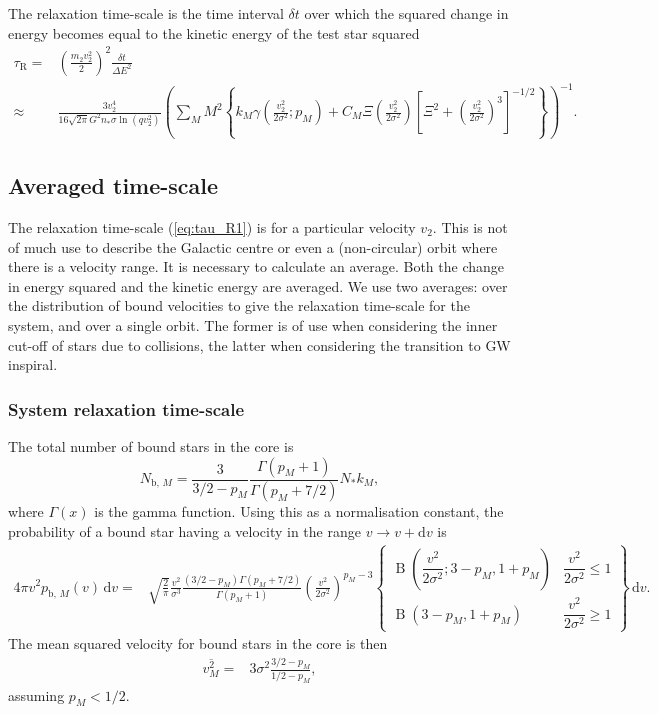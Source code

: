 \documentclass[useAMS,usedcolumn,usegraphicx,usenatbib]{mn2e}
\newcommand{\eqnref}[1]{(\ref{eq:#1})}
\DeclareMathOperator{\Beta}{B}
\newcommand{\sub}[1]{\ensuremath{_\mathrm{#1}}}
\newcommand{\dd}{\ensuremath{\mathrm{d}}}
\begin{document}
\begin{onecolumn}
The relaxation time-scale is the time interval $\delta t$ over which the squared change in energy becomes equal to the kinetic energy of the test star squared \citep{Bar-Or2012}
\begin{align}
\tau\sub{R} = {} & \left(\frac{m_2v_2^2}{2}\right)^2\frac{\delta t}{\Delta E^2} \\
 \approx {} & \frac{3v_2^4}{16\sqrt{2\pi}G^2n_\ast\sigma\ln\left(qv_2^2\right)} \left(\sum_M M^2 \left\{k_M \gamma\left(\frac{v_2^2}{2\sigma^2};p_M\right) + C_M\Xi\left(\frac{v_2^2}{2\sigma^2}\right)\left[\Xi^2 + \left(\frac{v_2^2}{2\sigma^2}\right)^3\right]^{-1/2}\right\}\right)^{-1}.
\label{eq:tau_R1}
\end{align}

\subsection{Averaged time-scale}

The relaxation time-scale \eqnref{tau_R1} is for a particular velocity $v_2$. This is not of much use to describe the Galactic centre or even a (non-circular) orbit where there is a velocity range. It is necessary to calculate an average. Both the change in energy squared and the kinetic energy are averaged. We use two averages: over the distribution of bound velocities to give the relaxation time-scale for the system, and over a single orbit. The former is of use when considering the inner cut-off of stars due to collisions, the latter when considering the transition to GW inspiral.

\subsubsection{System relaxation time-scale}\label{sec:system-ave}

The total number of bound stars in the core is
\begin{equation}
N_{\mathrm{b},\,M} = \frac{3}{3/2 - p_M}\frac{\Gamma(p_M + 1)}{\Gamma(p_M + 7/2)}N_\ast k_M,
\end{equation}
where $\Gamma(x)$ is the gamma function. Using this as a normalisation constant, the probability of a bound star having a velocity in the range $v \rightarrow v + \dd v$ is
\begin{align}
4\pi v^2 p_{\mathrm{b},\,M}(v) \,\dd v = {} & \sqrt{\frac{2}{\pi}} \frac{v^2}{\sigma^3} \frac{\left(3/2 - p_M\right)\Gamma(p_M + 7/2)}{\Gamma(p_M + 1)} \left(\frac{v^2}{2\sigma^2}\right)^{p_M - 3}\left\{\begin{array}{lr}
\Beta\left(\dfrac{v^2}{2\sigma^2}; 3 - p_M, 1 + p_M\right) & \dfrac{v^2}{2\sigma^2} \leq 1 \\
\Beta\left(3 - p_M, 1 + p_M\right) & \dfrac{v^2}{2\sigma^2} \geq 1\end{array}\right\}\,\dd v.
\end{align}
The mean squared velocity for bound stars in the core is then
\begin{align}
\overline{v^2_{M}} = {} & 3\sigma^2\frac{3/2 - p_M}{1/2 - p_M},
\end{align}
assuming $p_M < 1/2$.


\end{onecolumn}
\end{document}
